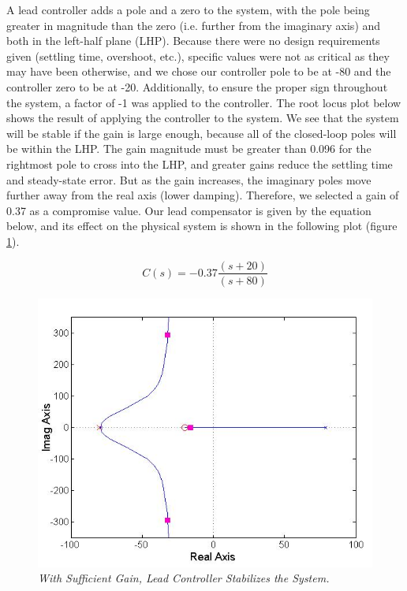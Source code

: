 \documentclass{article}
\theoremstyle{plain}
\theoremstyle{definition}
\theoremstyle{remark}
\begin{document}
A lead controller adds a pole and a zero to the system, with the pole being greater in magnitude than the zero (i.e. further from the imaginary axis) and both in the left-half plane (LHP). Because there were no design requirements given (settling time, overshoot, etc.), specific values were not as critical as they may have been otherwise, and we chose our controller pole to be at -80 and the controller zero to be at -20. Additionally, to ensure the proper sign throughout the system, a factor of -1 was applied to the controller. The root locus plot below shows the result of applying the controller to the system. We see that the system will be stable if the gain is large enough, because all of the closed-loop poles will be within the LHP. The gain magnitude must be greater than 0.096 for the rightmost pole to cross into the LHP, and greater gains reduce the settling time and steady-state error. But as the gain increases, the imaginary poles move further away from the real axis (lower damping). Therefore, we selected a gain of 0.37 as a compromise value. Our lead compensator is given by the equation below, and its effect on the physical system is shown in the following plot (figure \ref{Q2}). 

$$C(s)= -0.37 \frac{(s+20)}{(s+80)}$$

\begin{figure}[h!]
\begin{center}
\includegraphics[width = 12cm]{FigureB}
\caption{\emph{With Sufficient Gain, Lead Controller Stabilizes the System.}}
\label{Q2}
\end{center}
\end{figure}
\end{document}
